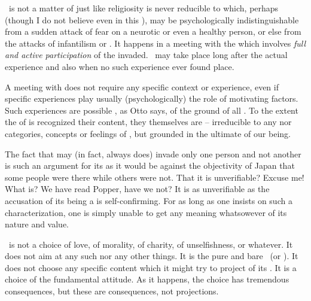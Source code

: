\subpa
\Sch\ is not a matter of  just like religiosity is
never reducible to  which, perhaps (though I do 
not believe even in this ), may be
psychologically indistinguishable from a sudden attack of fear on a
neurotic or even a healthy person, or else from the attacks of 
infantilism or . It happens in a meeting with the 
 which involves {\em full and active
participation} of the invaded.  \Sch\ may take place long after the
actual experience and also when no such experience ever found place.

A meeting with   
does not require any specific context or experience, even if
specific experiences play usually (psychologically) the role of
motivating factors.
%
Such experiences are possible , as Otto says,
 of the  ground of all
.  To the extent the  of  is
recognized  their content, 
they themselves are  -- irreducible to any  nor categories, concepts or feelings of , but
grounded in the ultimate  of our being.

%
The fact that  may (in fact, always does) invade only one
person and not another is such an argument for its 
as it would be against the objectivity of Japan that some people were
there while others were not.  That it is unverifiable?  Excuse me! 
What is?  We have read Popper, have we not?  It is as unverifiable as
the accusation of its being a  is
self-confirming.  For as long as one insists on such a
characterization, one is simply unable to get any meaning whatsowever
of its nature and value.  


\pa \Sch\ is not a choice of love, of morality, of charity, of
unselfishness, or whatever.  It does not aim at any such nor any other
things.  It is the pure and bare \yes\ (or \No).  It does not choose
any specific content which it might try to project  of
its .  It is a choice of the fundamental attitude. 
As it happens, the choice has tremendous consequences, but these are 
consequences, not projections.


